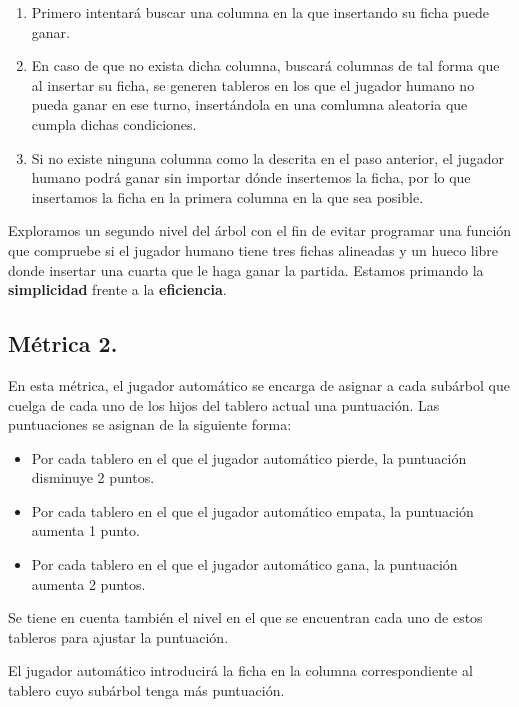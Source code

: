 \documentclass[11pt]{article}
\begin{document}
\begin{enumerate}
\item Primero intentará buscar una columna en la que insertando su ficha puede ganar.
\item En caso de que no exista dicha columna, buscará columnas de tal forma que al insertar su ficha, se generen tableros en los que el jugador humano no pueda ganar en ese turno, insertándola en una comlumna aleatoria que cumpla dichas condiciones.
\item Si no existe ninguna columna como la descrita en el paso anterior, el jugador humano podrá ganar sin importar dónde insertemos la ficha, por lo que insertamos la ficha en la primera columna en la que sea posible.
\end{enumerate}

Exploramos un segundo nivel del árbol con el fin de evitar programar una función que compruebe si el jugador humano tiene tres fichas alineadas y un hueco libre donde insertar una cuarta que le haga ganar la partida. Estamos primando la \textbf{\textbf{simplicidad}} frente a la \textbf{\textbf{eficiencia}}.

\subsection{Métrica 2.}
\label{sec-2-3}

En esta métrica, el jugador automático se encarga de asignar a cada subárbol que cuelga de cada uno de los hijos del tablero actual una puntuación. Las puntuaciones se asignan de la siguiente forma:

\begin{itemize}
\item Por cada tablero en el que el jugador automático pierde, la puntuación disminuye 2 puntos.
\item Por cada tablero en el que el jugador automático empata, la puntuación aumenta 1 punto.
\item Por cada tablero en el que el jugador automático gana, la puntuación aumenta 2 puntos.
\end{itemize}

Se tiene en cuenta también el nivel en el que se encuentran cada uno de estos tableros para ajustar la puntuación. 

El jugador automático introducirá la ficha en la columna correspondiente al tablero cuyo subárbol tenga más puntuación.
\end{document}
